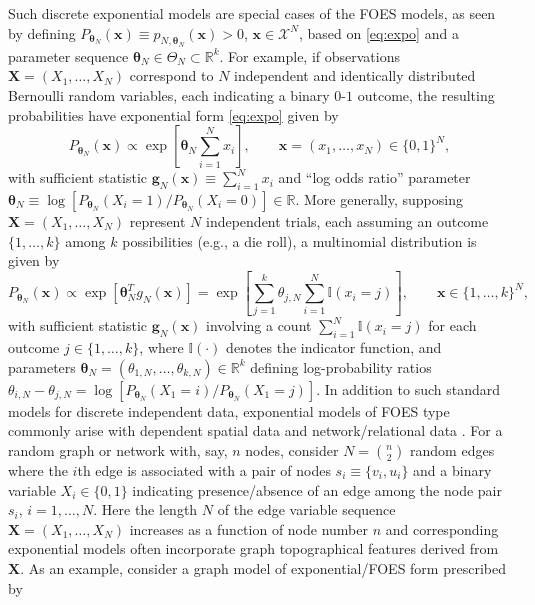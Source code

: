 \documentclass[numbib]{imamat}
\theoremstyle{theorem}
\theoremstyle{lemma}
\theoremstyle{example}
\theoremstyle{corollary}
\theoremstyle{definition}
\theoremstyle{remark}
\theoremstyle{approximation}
\theoremstyle{scheme}
\newcommand{\ak}[1]{{\color{blue} #1}}
\begin{document}
Such discrete \ak{exponential models} are special cases of the FOES models, as seen by defining \(P_{\boldsymbol \theta_N}(\boldsymbol x)\equiv p_{N,\boldsymbol \theta_N}(\boldsymbol x)> 0\), \(\boldsymbol x \in \mathcal{X}^N\), based on \eqref{eq:expo} and a parameter sequence \(\boldsymbol \theta_N \in \Theta_N \subset \mathbb{R}^k\). For example, if observations \(\boldsymbol X = (X_1,\ldots,X_N)\) correspond to \(N\) independent and identically distributed Bernoulli random variables, each indicating a binary \(0\)-\(1\) outcome, the resulting probabilities have exponential form \eqref{eq:expo} given by
\begin{equation}
\label{eq:mod1}
P_{\boldsymbol \theta_N}(\boldsymbol x) \propto
 \exp\left[\boldsymbol \theta_N \sum_{i=1}^N x_i\right], \qquad \boldsymbol x=(x_1,\ldots,x_N) \in\{0,1\}^N, 
 \end{equation}
with sufficient statistic \(\boldsymbol g_N(\boldsymbol x)\equiv \sum_{i=1}^N x_i\) and ``log odds ratio'' parameter \(\boldsymbol \theta_N \equiv \log[ P_{\boldsymbol \theta_N}(X_i=1)/P_{\boldsymbol \theta_N}(X_i=0) ] \in \mathbb{R}\). More generally, supposing \(\boldsymbol X =(X_1,\ldots,X_N)\) represent \(N\) independent trials, each assuming an outcome \(\{1,\ldots,k\}\) among \(k\) possibilities (e.g., a die roll), a multinomial distribution is given by
\begin{equation}
\label{eq:mod11}
P_{\boldsymbol \theta_N}(\boldsymbol x) \propto  \exp\left[  \boldsymbol \theta_{N}^T g_N(\boldsymbol x)   \right] =
\exp\left[ \sum_{j=1}^k {\theta_{j,N}} \sum_{i=1}^N \mathbb{I}(x_i=j) \right], \qquad \boldsymbol x  \in\{1,\ldots,k\}^N, 
\end{equation}
with sufficient statistic \(\boldsymbol g_N(\boldsymbol x)\) involving a count \(\sum_{i=1}^N \mathbb{I}(x_i=j)\) for each outcome \(j \in \{1,\ldots,k\}\), where \(\mathbb{I}(\cdot)\) denotes the indicator function, and parameters \(\boldsymbol \theta_N=(\theta_{1,N},\ldots,\theta_{k,N})\in\mathbb{R}^k\) defining log-probability ratios \(\theta_{i,N}-\theta_{j,N} =\log [P_{\boldsymbol \theta_N}(X_1=i)/P_{\boldsymbol \theta_N}(X_1=j)]\). In addition to such standard models for discrete independent data, exponential models of FOES type commonly arise with dependent spatial data \citep{besag1974spatial} and network/relational data \citep{wasserman1994social, handcock2003assessing}. For a random graph or network with, say, \(n\) nodes, consider \(N={n \choose 2}\) random edges where the \(i\)th edge is associated with a pair of nodes \(s_i \equiv \{v_i,u_i\}\) and a binary variable \(X_i\in\{0,1\}\) indicating presence/absence of an edge among the node pair \(s_i\), \(i=1,\ldots,N\). Here the length \(N\) of the edge variable sequence \(\boldsymbol X = (X_1,\ldots,X_N)\) increases as a function of node number \(n\) and corresponding exponential models often incorporate graph topographical features derived from \(\boldsymbol X\). As an example, consider a graph model of exponential/FOES form prescribed by
\end{document}
